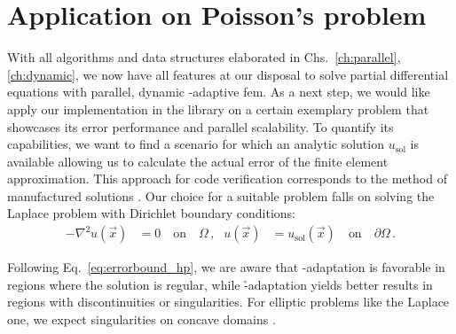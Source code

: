 \chapter{Application on Poisson's problem}
\label{ch:results}
\glsresetall


With all algorithms and data structures elaborated in Chs.~\ref{ch:parallel}, \ref{ch:dynamic}, we now have all features at our disposal to solve partial differential equations with parallel, dynamic \hp-adaptive \gls{fem}. As a next step, we would like apply our implementation in the \dealii{} library on a certain exemplary problem that showcases its error performance and parallel scalability. To quantify its capabilities, we want to find a scenario for which an analytic solution $u_\text{sol}$ is available allowing us to calculate the actual error of the finite element approximation. This approach for code verification corresponds to the method of manufactured solutions \parencite{salari2000}. Our choice for a suitable problem falls on solving the Laplace problem with Dirichlet boundary conditions:
\begin{align}
- \nabla^2 u(\vec{x}) &= 0 \quad\text{on}\quad \Omega \,\text{,} & u(\vec{x}) &= u_\text{sol}(\vec{x}) \quad\text{on}\quad \partial\Omega \,\text{.}
\end{align}

Following Eq.~\ref{eq:errorbound_hp}, we are aware that \p-adaptation is favorable in regions where the solution is regular, while \h-adaptation yields better results in regions with discontinuities or singularities. For elliptic problems like the Laplace one, we expect singularities on concave domains \parencite[Sec.~5.5]{brenner2008}.

